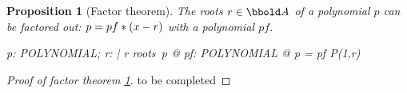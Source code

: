 \documentclass[12pt]{scrartcl}
\newtheorem{prop}{Proposition}[section]
\begin{document}
\begin{prop}[Factor theorem]
  \label{prop:factor-theorem}
  The roots $r \in \arithmos$ of a polynomial $p$ can be factored out: $p
  = pf * (x-r)$ with a polynomial $pf$.
  \begin{zed}
    \forall p: POLYNOMIAL; r: \arithmos | r \in roots~p @ \exists pf: POLYNOMIAL @ p =
    pf \polymult P(1,r)
  \end{zed}
\end{prop}
\begin{proof}[Proof of factor theorem \ref{prop:factor-theorem}]
  to be completed
\end{proof}
% 
\printbibliography{}

\end{document}
